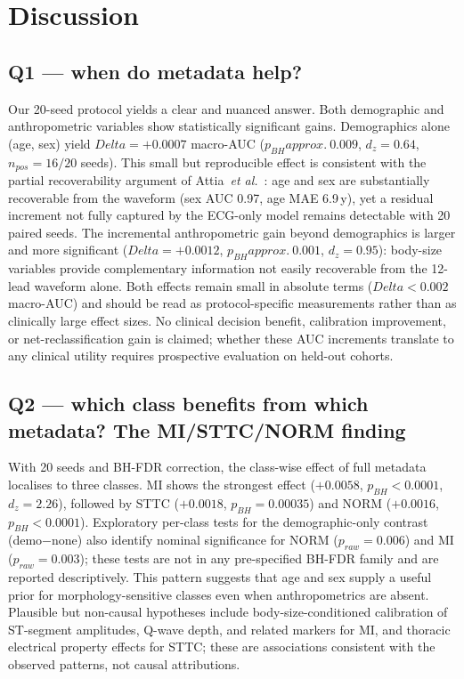 \documentclass[mathematics,article,submit,pdftex]{Definitions/mdpi}
\def\texttt#1{#1}%
\def\mathrm#1{#1}%
\def\textbf#1{#1}%
\def\Delta{Delta }%
\def\approx{approx.\ }%
\begin{document}
\section{Discussion}\label{sec:discussion}

\subsection{Q1 --- when do metadata help?}
Our 20-seed protocol yields a clear and nuanced answer. \textbf{Both demographic and anthropometric variables show statistically significant gains.} Demographics alone (age, sex) yield $\Delta{=}+0.0007$ macro-AUC ($p_{\mathrm{BH}}{\approx}0.009$, $d_{\mathrm{z}}{=}0.64$, $n_{\mathrm{pos}}{=}16/20$ seeds). This small but reproducible effect is consistent with the partial recoverability argument of Attia~\textit{et al.}~\cite{Attia2019AgeSex}: age and sex are substantially recoverable from the waveform (sex AUC 0.97, age MAE 6.9\,y), yet a residual increment not fully captured by the ECG-only model remains detectable with 20 paired seeds. The incremental anthropometric gain beyond demographics is larger and more significant ($\Delta{=}+0.0012$, $p_{\mathrm{BH}}{\approx}0.001$, $d_{\mathrm{z}}{=}0.95$): body-size variables provide complementary information not easily recoverable from the 12-lead waveform alone. Both effects remain small in absolute terms ($\Delta{<}0.002$ macro-AUC) and should be read as protocol-specific measurements rather than as clinically large effect sizes. No clinical decision benefit, calibration improvement, or net-reclassification gain is claimed; whether these AUC increments translate to any clinical utility requires prospective evaluation on held-out cohorts.

\subsection{Q2 --- which class benefits from which metadata? The MI/STTC/NORM finding}
With 20 seeds and BH-FDR correction, the class-wise effect of full metadata localises to three classes. \textbf{MI} shows the strongest effect ($+0.0058$, $p_{\mathrm{BH}}{<}0.0001$, $d_{\mathrm{z}}{=}2.26$), followed by \textbf{STTC} ($+0.0018$, $p_{\mathrm{BH}}{=}0.00035$) and \textbf{NORM} ($+0.0016$, $p_{\mathrm{BH}}{<}0.0001$). Exploratory per-class tests for the demographic-only contrast (\texttt{demo}$-$\texttt{none}) also identify nominal significance for NORM ($p_{\mathrm{raw}}{=}0.006$) and MI ($p_{\mathrm{raw}}{=}0.003$); these tests are not in any pre-specified BH-FDR family and are reported descriptively. This pattern suggests that age and sex supply a useful prior for morphology-sensitive classes even when anthropometrics are absent. Plausible but non-causal hypotheses include body-size-conditioned calibration of ST-segment amplitudes, Q-wave depth, and related markers for MI, and thoracic electrical property effects for STTC; these are associations consistent with the observed patterns, not causal attributions.
\end{document}
